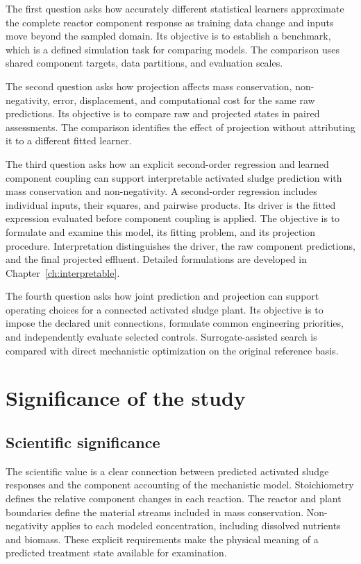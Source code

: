 The first question asks how accurately different statistical learners approximate the complete reactor component response as training data change and inputs move beyond the sampled domain. Its objective is to establish a benchmark, which is a defined simulation task for comparing models. The comparison uses shared component targets, data partitions, and evaluation scales.

The second question asks how projection affects mass conservation, non-negativity, error, displacement, and computational cost for the same raw predictions. Its objective is to compare raw and projected states in paired assessments. The comparison identifies the effect of projection without attributing it to a different fitted learner.

The third question asks how an explicit second-order regression and learned component coupling can support interpretable activated sludge prediction with mass conservation and non-negativity. A second-order regression includes individual inputs, their squares, and pairwise products. Its driver is the fitted expression evaluated before component coupling is applied. The objective is to formulate and examine this model, its fitting problem, and its projection procedure. Interpretation distinguishes the driver, the raw component predictions, and the final projected effluent. Detailed formulations are developed in Chapter~\ref{ch:interpretable}.

The fourth question asks how joint prediction and projection can support operating choices for a connected activated sludge plant. Its objective is to impose the declared unit connections, formulate common engineering priorities, and independently evaluate selected controls. Surrogate-assisted search is compared with direct mechanistic optimization on the original reference basis.

\section{Significance of the study}

\subsection{Scientific significance}

The scientific value is a clear connection between predicted activated sludge responses and the component accounting of the mechanistic model. Stoichiometry defines the relative component changes in each reaction. The reactor and plant boundaries define the material streams included in mass conservation. Non-negativity applies to each modeled concentration, including dissolved nutrients and biomass. These explicit requirements make the physical meaning of a predicted treatment state available for examination.

